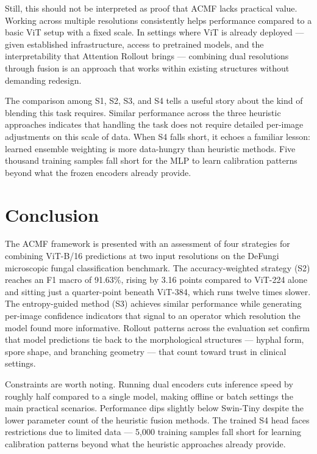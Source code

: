 \documentclass[conference]{IEEEtran}
\begin{document}
Still, this should not be interpreted as proof that ACMF lacks practical
value. Working across multiple resolutions consistently helps performance
compared to a basic ViT setup with a fixed scale. In settings where ViT is
already deployed --- given established infrastructure, access to pretrained
models, and the interpretability that Attention Rollout brings --- combining
dual resolutions through fusion is an approach that works within existing
structures without demanding redesign.

The comparison among S1, S2, S3, and S4 tells a useful story about the kind
of blending this task requires. Similar performance across the three heuristic
approaches indicates that handling the task does not require detailed per-image
adjustments on this scale of data. When S4 falls short, it echoes a familiar
lesson: learned ensemble weighting is more data-hungry than heuristic methods.
Five thousand training samples fall short for the MLP to learn calibration
patterns beyond what the frozen encoders already provide.

\vspace{-2pt}
\section{Conclusion}

The ACMF framework is presented with an assessment of four strategies for
combining ViT-B/16 predictions at two input resolutions on the DeFungi
microscopic fungal classification benchmark. The accuracy-weighted strategy
(S2) reaches an F1 macro of 91.63\%, rising by 3.16 points compared to
ViT-224 alone and sitting just a quarter-point beneath ViT-384, which runs
twelve times slower. The entropy-guided method (S3) achieves similar
performance while generating per-image confidence indicators that signal to
an operator which resolution the model found more informative. Rollout patterns
across the evaluation set confirm that model predictions tie back to the
morphological structures --- hyphal form, spore shape, and branching geometry
--- that count toward trust in clinical settings.

Constraints are worth noting. Running dual encoders cuts inference speed by
roughly half compared to a single model, making offline or batch settings the
main practical scenarios. Performance dips slightly below Swin-Tiny despite
the lower parameter count of the heuristic fusion methods. The trained S4 head
faces restrictions due to limited data --- 5,000 training samples fall short
for learning calibration patterns beyond what the heuristic approaches already
provide.
\end{document}
